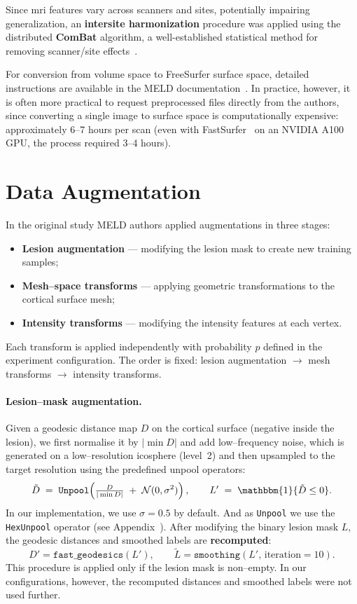\documentclass[FCD_GNN.tex]{subfiles}
\begin{document}
Since \ac{mri} features vary across scanners and sites, potentially impairing generalization, 
an \textbf{intersite harmonization} procedure was applied using the distributed \textbf{ComBat} algorithm, 
a well-established statistical method for removing scanner/site effects~\cite{Ripart2025MELD}.

For conversion from volume space to FreeSurfer surface space, detailed instructions are available in the MELD documentation~\cite{MELDdocs}.
In practice, however, it is often more practical to request preprocessed files directly from the authors, 
since converting a single image to surface space is computationally expensive: approximately 6–7 hours per scan 
(even with FastSurfer~\cite{Henschel2020FastSurfer} on an NVIDIA A100 GPU, the process required 3–4 hours).

\section{Data Augmentation}
In the original study MELD authors applied augmentations in three stages: 
\begin{itemize}
    \item \textbf{Lesion augmentation} — modifying the lesion mask to create new training samples;
    \item \textbf{Mesh--space transforms} — applying geometric transformations to the cortical surface mesh;
    \item \textbf{Intensity transforms} — modifying the intensity features at each vertex.
\end{itemize}
Each transform is applied independently with probability $p$ defined in the experiment configuration. 
The order is fixed: lesion augmentation $\rightarrow$ mesh transforms $\rightarrow$ intensity transforms.

\paragraph{Lesion--mask augmentation.}
Given a geodesic distance map $D$ on the cortical surface (negative inside the lesion),
we first normalise it by $|\min D|$ and add low–frequency noise, which is generated on a low–resolution icosphere (level~2) and then upsampled to the target resolution using the predefined unpool operators:
\[
\tilde{D} \;=\; \texttt{Unpool}\!\left(\tfrac{D}{|\min D|} \;+\; \mathcal{N}(0,\sigma^2)\right), 
\qquad
L' \;=\; \mathbbm{1}\{\tilde{D}\le 0\}.
\]
In our implementation, we use $\sigma = 0.5$ by default. And as \texttt{Unpool} we use the \texttt{HexUnpool} operator (see Appendix~).
After modifying the binary lesion mask $L$, the geodesic distances and smoothed labels are 
\textbf{recomputed}:
\[
D'=\texttt{fast\_geodesics}(L'), 
\qquad
\widetilde{L}=\texttt{smoothing}(L',\,\text{iteration}=10).
\]
This procedure is applied only if the lesion mask is non–empty.  
In our configurations, however, the recomputed distances and smoothed labels were not used further.
\end{document}
